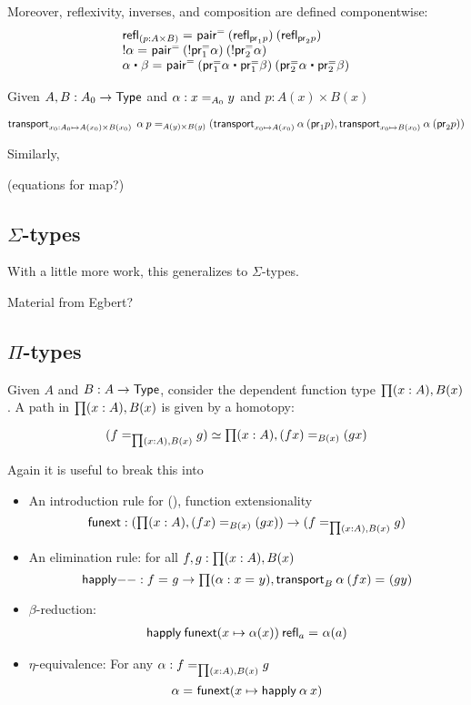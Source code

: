 Moreover, reflexivity, inverses, and composition are defined
componentwise:
\[
\begin{array}{l}
\id {\refl{(p : A \times B)}} {\pairpath \: (\refl{\proj{1} p}) \: (\refl{\proj{2} p})} \\
\id {\opp{\alpha}} {\pairpath \: (\opp{\projpath{1} \alpha}) \: (\opp{\projpath{2} \alpha})}  \\
\id {{\alpha \ct \beta}} {\pairpath \: 
  ({\projpath{1} \alpha} \ct
   {\projpath{1} \beta})
   \: 
   ({\projpath{2} \alpha} \ct {\projpath{2} \beta})}
\end{array}
\]

Given $ A, B : A_0 \to \type$ and $\alpha : \id[A_0]{x}{y}$ 
and $p : A(x) \times B(x)$

\[
\id[A(y) \times B(y)]{\transport{x_0:A_0 \mapsto A(x_0) \times B(x_0)}
  \: \alpha \: {p}}
   {(\transport{x_0 \mapsto A(x_0)} \alpha \: (\proj{1} p), 
       \transport{x_0 \mapsto B(x_0)} \alpha \: (\proj{2} p))}
\]

Similarly, 

(equations for map?)

\subsection{$\Sigma$-types}

With a little more work, this generalizes to $\Sigma$-types. 

Material from Egbert?

\subsection{$\Pi$-types}

Given $A$ and $B : A \to \type$, consider the dependent function type $\prd{x:A}B(x)$.
A path in $\prd{x:A} B(x)$ is given by a homotopy:  

\[
\eqv{(\id[\prd{x:A} B(x)]{f}{g})}{\prd{x:A} \id[B(x)]{(f x)}{(g x)}}
\]

Again it is useful to break this into 

\begin{itemize}
\item An introduction rule for {()}, function extensionality
  \[
  \funext : (\prd{x:A} \id[B(x)]{(f x)}{(g x)}) \to {(\id[\prd{x:A} B(x)]{f}{g})}
  \]
\item An elimination rule: for all $f,g : \prd{x:A} B(x)$
  \[
  \happly{-}{-} : \id{f}{g} \to \prd{\alpha : \id{x}{y}} \id{\transport{B}{\alpha} \: {(f x)}}{(g y)}
  \]
\item $\beta$-reduction: 
  \[
  \begin{array}{l}
  \id{\happly \: {\funext{(x \mapsto \alpha(x))}} \: {\refl{a}}}{\alpha(a)}
  \end{array}
  \]
\item $\eta$-equivalence: For any $\alpha : \id[\prd{x:A} B(x)] f g$
  \[
  \id{\alpha}{\funext (x \mapsto \happly \: \alpha \: x)}
  \]
\end{itemize}

